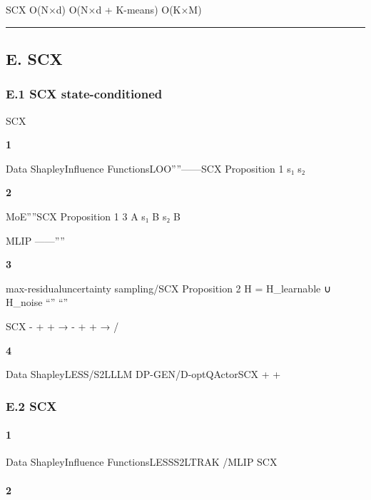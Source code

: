 \documentclass[
  12pt,
]{article}
\begin{document}
SCX  O(N×d) O(N×d +
K-means) O(K×M)

\begin{center}\rule{0.5\linewidth}{0.5pt}\end{center}

\subsection{E. SCX
}\label{e.-scx-ux7684ux72ecux7279ux5b9aux4f4d}

\subsubsection{E.1 SCX  state-conditioned
}\label{e.1-scx-ux7684-state-conditioned-ux89c6ux89d2ux586bux8865ux4e86ux4ec0ux4e48ux7a7aux767d}

SCX 

\textbf{ 1}

Data ShapleyInfluence
FunctionsLOO''''------SCX
 Proposition 1  s₁ 
s₂ \textbf{}



\textbf{ 2}

MoE''''SCX
Proposition 1  3 A  s₁  B s₂
 B

 MLIP
------''''

\textbf{ 3}

max-residualuncertainty
sampling/SCX  Proposition 2
 H = H\_learnable ∪
H\_noise ``'' 
``''

SCX  -  +  +  →
 -  +  +  → /

\textbf{ 4}

Data ShapleyLESS/S2LLLM
DP-GEN/D-optQActorSCX
 +  +


\subsubsection{E.2 
SCX}\label{e.2-ux4e3aux4ec0ux4e48ux73b0ux6709ux65b9ux6cd5ux65e0ux6cd5ux76f4ux63a5ux66ffux4ee3-scx}

\paragraph{
1}\label{ux4e0dux80fdux66ffux4ee3ux7684ux7406ux7531-1ux5168ux5c40ux65e0ux6cd5ux8868ux8fbeux5c40ux90e8}

Data ShapleyInfluence FunctionsLESSS2LTRAK
\textbf{}/\textbf{}MLIP
SCX 

\paragraph{
2}\label{ux4e0dux80fdux66ffux4ee3ux7684ux7406ux7531-2ux76d1ux7763ux4fe1ux53f7ux672aux88abux5229ux7528}
\end{document}
